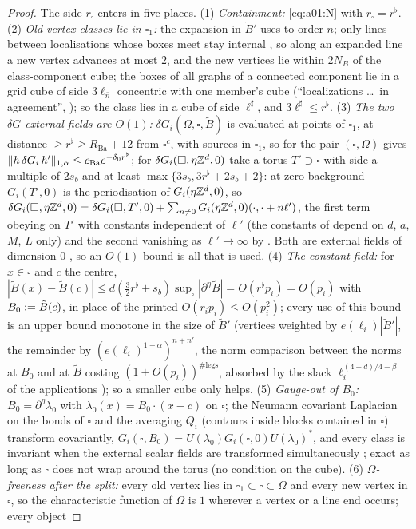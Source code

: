 \begin{proof}
The side $r_\square$ enters \cite[pp.~433--434]{Ba3} in five places. (1) \emph{Containment:} \eqref{eq:a01:N} with $r_\square=r^\flat$. (2) \emph{Old-vertex classes lie in $\square_1$:} the expansion in $\tilde B'$ uses \cite[(3.14), (3.44), (3.45)]{Ba1} to order $\bar n$; only lines between localisations whose boxes meet stay internal \cite[p.~432]{Ba3}, so along an expanded line a new vertex advances at most $2$, and the new vertices lie within $2N_B$ of the class-component cube; the boxes of all graphs of a connected component lie in a grid cube of side $3\ell_{\bar n}$ concentric with one member's cube (``localizations \dots\ in agreement'', \cite[p.~432]{Ba3}); so the class lies in a cube of side $\ell^\sharp$, and $3\ell^\sharp\le r^\flat$. (3) \emph{The two $\delta G$ external fields are $O(1)$:} $\delta G_i(\Omega,\square,\tilde B)$ is evaluated at points of $\square_1$, at distance $\ge r^\flat\ge R_{\mathrm{Ba}}+12$ from $\square^c$, with sources in $\square_1$, so \cite[(2.26)]{Ba1} for the pair $(\square,\Omega)$ gives $\lVert h\,\delta G_i\,h'\rVert_{1,\alpha}\le c_{\mathrm{Ba}}e^{-\delta_0r^\flat}$; for $\delta G_i(\square,\eta\mathbb Z^d,0)$ take a torus $T'\supset\square$ with side a multiple of $2s_b$ and at least $\max\{3s_b,3r^\flat+2s_b+2\}$: at zero background $G_i(T',0)$ is the periodisation of $G_i(\eta\mathbb Z^d,0)$, so $\delta G_i(\square,\eta\mathbb Z^d,0)=\delta G_i(\square,T',0)+\sum_{n\ne0}G_i(\eta\mathbb Z^d,0)(\cdot,\cdot+n\ell')$, the first term obeying \cite[(2.26)]{Ba1} on $T'$ with constants independent of $\ell'$ (the constants of \cite{Ba4} depend on $d$, $a$, $M$, $L$ only) and the second vanishing as $\ell'\to\infty$ by \cite[(2.25)]{Ba1}. Both are external fields of dimension $0$ \cite[(2.1), p.~422]{Ba3}, so an $O(1)$ bound is all that is used. (4) \emph{The constant field:} for $x\in\square$ and $c$ the centre, $|\tilde B(x)-\tilde B(c)|\le d(\frac32r^\flat+s_b)\sup_\square|\partial^\eta\tilde B|=O(r^\flat p_i)=O(p_i)$ with $B_0:=\tilde B(c)$, in place of the printed $O(r_ip_i)\le O(p_i^2)$; every use of this bound is an upper bound monotone in the size of $\tilde B'$ (vertices weighted by $e(\ell_i)|\tilde B'|$, the remainder \cite[(1.16)]{Ba3} by $(e(\ell_i)^{1-\alpha})^{n+n'}$, the norm comparison between the norms \cite[(1.32)]{Ba3} at $B_0$ and at $\tilde B$ costing $(1+O(p_i))^{\#\mathrm{legs}}$, absorbed by the slack $\ell_i^{(4-d)/4-\beta}$ of the applications \cite[p.~421]{Ba3}); so a smaller cube only helps. (5) \emph{Gauge-out of $B_0$:} $B_0=\partial^\eta\lambda_0$ with $\lambda_0(x)=B_0\cdot(x-c)$ on $\square$; the Neumann covariant Laplacian on the bonds of $\square$ and the averaging $Q_i$ (contours inside blocks contained in $\square$) transform covariantly, $G_i(\square,B_0)=U(\lambda_0)G_i(\square,0)U(\lambda_0)^*$, and every class is invariant when the external scalar fields are transformed simultaneously \cite[(2.69)--(2.74)]{Ba2}; exact as long as $\square$ does not wrap around the torus (no condition on the cube). (6) \emph{$\Omega$-freeness after the split:} every old vertex lies in $\square_1\subset\square\subset\Omega$ and every new vertex in $\square$, so the characteristic function of $\Omega$ is $1$ wherever a vertex or a line end occurs; every object 
\end{proof}
